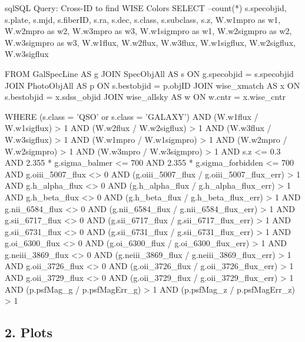\documentclass[letterpaper, oneside]{article}
\begin{document}
	\begin{sourcecode}[\label{wise_query}]{sql}{SQL Query: Cross-ID to find WISE Colors}
		SELECT --count(*)
		s.specobjid, s.plate, s.mjd, s.fiberID, 
		s.ra, s.dec, s.class, s.subclass, s.z, 
		W.w1mpro as w1, W.w2mpro as w2, W.w3mpro as w3, 
		W.w1sigmpro as w1, W.w2sigmpro as w2, W.w3sigmpro as w3, 
		W.w1flux, W.w2flux, W.w3flux, 
		W.w1sigflux, W.w2sigflux, W.w3sigflux
		
		FROM GalSpecLine AS g 
		JOIN SpecObjAll AS s ON g.specobjid = s.specobjid
		JOIN PhotoObjAll AS p ON s.bestobjid = p.objID
		JOIN wise_xmatch AS x ON s.bestobjid = x.sdss_objid JOIN wise_allsky AS w ON w.cntr = x.wise_cntr
		
		WHERE
		(s.class = 'QSO' or s.class = 'GALAXY')
		AND (W.w1flux / W.w1sigflux) > 1
		AND (W.w2flux / W.w2sigflux) > 1
		AND (W.w3flux / W.w3sigflux) > 1
		AND (W.w1mpro / W.w1sigmpro) > 1
		AND (W.w2mpro / W.w2sigmpro) > 1
		AND (W.w3mpro / W.w3sigmpro) > 1
		AND s.z <= 0.3
		AND 2.355 * g.sigma_balmer <= 700
		AND 2.355 * g.sigma_forbidden <= 700
		AND g.oiii_5007_flux <> 0
		AND (g.oiii_5007_flux / g.oiii_5007_flux_err) > 1
		AND g.h_alpha_flux <> 0
		AND (g.h_alpha_flux / g.h_alpha_flux_err) > 1
		AND g.h_beta_flux <> 0
		AND (g.h_beta_flux / g.h_beta_flux_err) > 1
		AND g.nii_6584_flux <> 0
		AND (g.nii_6584_flux / g.nii_6584_flux_err) > 1
		AND g.sii_6717_flux <> 0
		AND (g.sii_6717_flux / g.sii_6717_flux_err) > 1
		AND g.sii_6731_flux <> 0
		AND (g.sii_6731_flux / g.sii_6731_flux_err) > 1
		AND g.oi_6300_flux <> 0
		AND (g.oi_6300_flux / g.oi_6300_flux_err) > 1
		AND g.neiii_3869_flux <> 0
		AND (g.neiii_3869_flux / g.neiii_3869_flux_err) > 1
		AND g.oii_3726_flux <> 0
		AND (g.oii_3726_flux / g.oii_3726_flux_err) > 1
		AND g.oii_3729_flux <> 0
		AND (g.oii_3729_flux / g.oii_3729_flux_err) > 1
		AND (p.psfMag_g / p.psfMagErr_g) > 1
		AND (p.psfMag_z / p.psfMagErr_z) > 1
	\end{sourcecode}

	\subsection*{2. Plots}
	
\end{document}
